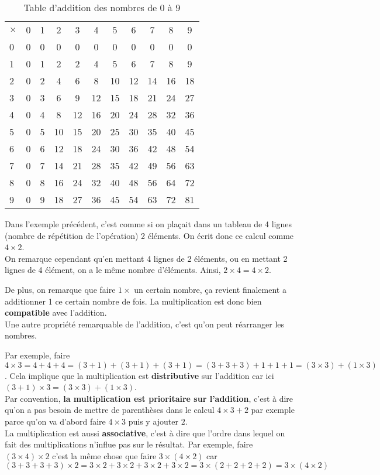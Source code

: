 \begin{table}[!ht] \centering
\begin{tabular}{|l||c|c|c|c|c|c|c|c|c|c|}
\hline
$\times$&0&1&2&3&4&5&6&7&8&9\\\hhline{|=||=|=|=|=|=|=|=|=|=|=|}
0&0&0&0&0&0&0&0&0&0&0\\\hline
1&0&1&2&2&4&5&6&7&8&9\\\hline
2&0&2&4&6&8&10&12&14&16&18\\\hline
3&0&3&6&9&12&15&18&21&24&27\\\hline
4&0&4&8&12&16&20&24&28&32&36\\\hline
5&0&5&10&15&20&25&30&35&40&45\\\hline
6&0&6&12&18&24&30&36&42&48&54\\\hline
7&0&7&14&21&28&35&42&49&56&63\\\hline
8&0&8&16&24&32&40&48&56&64&72\\\hline
9&0&9&18&27&36&45&54&63&72&81\\\hline
\end{tabular}
\caption{Table d'addition des nombres de 0 à 9}
\end{table}

Dans l'exemple précédent, c'est comme si on plaçait dans un tableau de 4 lignes (nombre de répétition de l'opération) 2 éléments. On écrit donc ce calcul comme $4 \times 2$. \\
On remarque cependant qu'en mettant 4 lignes de 2 éléments, ou en mettant 2 lignes de 4 élément, on a le même nombre d'éléments. Ainsi, $2\times 4= 4 \times 2$.

De plus, on remarque que faire $1\times$ un certain nombre, ça revient finalement a additionner 1 ce certain nombre de fois. La multiplication est donc bien \textbf{compatible} avec l'addition.\\
Une autre propriété remarquable de l'addition, c'est qu'on peut réarranger les nombres. 

Par exemple, faire $4\times 3 = 4+4+4 = (3+1)+(3+1)+(3+1)= (3+3+3) + 1+1+1 = (3\times 3) + (1\times 3)$.
Cela implique que la multiplication est \textbf{distributive} sur l'addition car ici $(3+1)\times 3=(3\times 3)+(1\times 3)$.\\
Par convention, \textbf{la multiplication est prioritaire sur l'addition}, c'est à dire qu'on a pas besoin de mettre de parenthèses dans le calcul $4\times 3 + 2$ par exemple parce qu'on va d'abord faire $4 \times 3$ puis y ajouter $2$.\\
La multiplication est aussi \textbf{associative}, c'est à dire que l'ordre dans lequel on fait des multiplications n'influe pas sur le résultat. Par exemple, faire $(3 \times 4) \times 2$ c'est la même chose que faire $3 \times (4 \times 2)$ car 
\[
(3+3+3+3) \times 2 = 3 \times 2 + 3 \times 2 + 3 \times 2 + 3 \times 2 = 3 \times (2+2+2+2)=3 \times (4 \times 2)
\]

